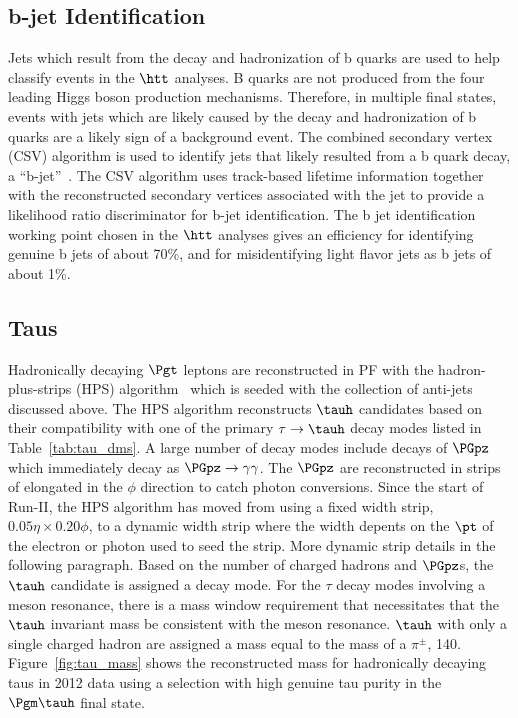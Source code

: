 \subsection{b-jet Identification}
\label{sec:reco_b_jet}
Jets which result from the decay and hadronization of b quarks are used to help classify events
in the $\htt$ analyses. B quarks are not produced from the four leading Higgs boson production
mechanisms. Therefore, in multiple final states, events with jets which are likely caused by the decay and
hadronization of b quarks are a likely sign of a background event.
The combined secondary vertex (CSV) algorithm is used to identify jets that likely resulted
from a b quark decay, a ``b-jet''~\cite{CMS:2016kkf, 1748-0221-8-04-P04013}. 
The CSV algorithm uses track-based lifetime information together with 
the reconstructed secondary vertices associated with the jet to provide a likelihood ratio 
discriminator for b-jet identification. The b jet identification working point chosen in the $\htt$ analyses 
gives an efficiency for identifying genuine b jets of about 70\%, and for misidentifying light flavor jets
as b jets of about 1\%.


\subsection{Taus}
\label{sec:obj_reco_tau}
Hadronically decaying $\Pgt$ leptons are reconstructed in PF with the hadron-plus-strips (HPS)
algorithm~\cite{Khachatryan:2015dfa, CMS-PAS-TAU-16-002} which is seeded with the collection of 
anti-\kt jets discussed above. The HPS algorithm reconstructs $\tauh$ candidates based on their
compatibility with one of the primary $\tau\to\tauh$ decay modes listed in Table~\ref{tab:tau_dms}.
A large number of decay modes include decays of $\PGpz$ which immediately decay as 
$\PGpz  \to  \gamma\gamma$. The $\PGpz$ are
reconstructed in strips of \etaphi elongated in the $\phi$ direction to catch photon conversions.
Since the start of Run-II, the HPS algorithm has moved from using a fixed width strip,
$0.05 \eta \times 0.20 \phi$, to a dynamic width strip where the width depents on the 
$\pt$ of the electron or photon used to seed the strip. More dynamic strip details in the following paragraph.
Based on the number of
charged hadrons and $\PGpz$s, the $\tauh$ candidate is assigned a decay mode. For the $\tau$
decay modes involving a meson resonance, there is a mass window requirement that necessitates
that the $\tauh$ invariant mass be consistent with the meson resonance. $\tauh$ with only a single
charged hadron are assigned a mass equal to the mass of a $\pi^{\pm}$, 140\MeV. Figure~\ref{fig:tau_mass}
shows the reconstructed mass for hadronically decaying taus in 2012 data using a selection with
high genuine tau purity in the $\Pgm\tauh$ final state.

